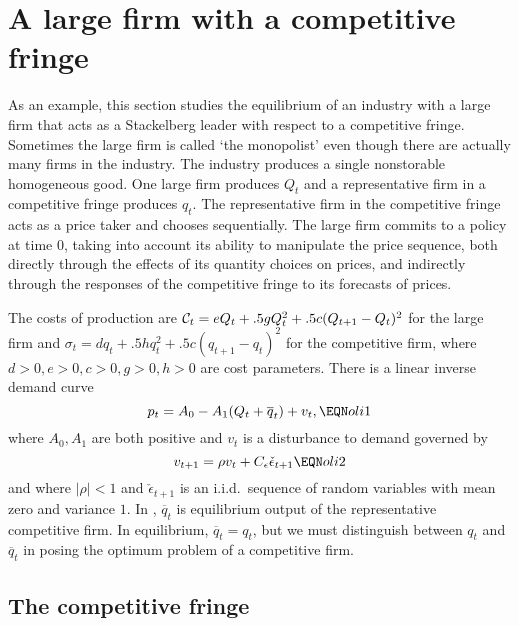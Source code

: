 \section{A large firm with a competitive fringe}

As an example, this section studies the equilibrium of an industry with
a large firm that acts as a Stackelberg leader with respect to a competitive
fringe.  Sometimes the large firm is called `the monopolist' even though there are
actually many firms in the industry.  The industry produces a single nonstorable homogeneous good. One
large firm produces $Q_t$ and a representative firm in a competitive
fringe produces $q_t$.  The representative firm in the competitive
fringe acts as a price taker and chooses sequentially.  The large firm
commits to a policy at time $0$, taking into account its ability to
manipulate the price sequence, both directly through the effects of
its quantity choices on prices, and indirectly through the responses of
the competitive fringe to its forecasts of prices.

  The costs of production are
${\cal C}_t = e Q_t + .5 g Q_t^2+ .5 c (Q_{t+1} - Q_{t})^2 $
for the large firm
and $ \sigma_t= d q_t + .5 h q_t^2 + .5 c (q_{t+1} - q_t)^2$
for the competitive firm,
where $d>0, e >0, c>0, g >0, h>0 $ are cost parameters.
There is a linear inverse demand curve
$$ p_t = A_0 - A_1 (Q_t + \overline q_t) + v_t, \EQN oli1 $$
where $A_0, A_1$ are both positive and  $v_t$ is a disturbance
to demand governed by
$$ v_{t+1}= \rho v_t + C_\epsilon \check \epsilon_{t+1} \EQN oli2 $$
and where $ | \rho | < 1$ and $\check \epsilon_{t+1}$ is an i.i.d.\
sequence of random variables with mean zero and variance $1$.
In , $\overline q_t$ is equilibrium output  of the representative
competitive firm.  In equilibrium, $\overline q_t = q_t$, but we
must distinguish between $q_t$ and $\overline q_t$ in posing the optimum
problem of a competitive firm.

\subsection{The competitive fringe}

